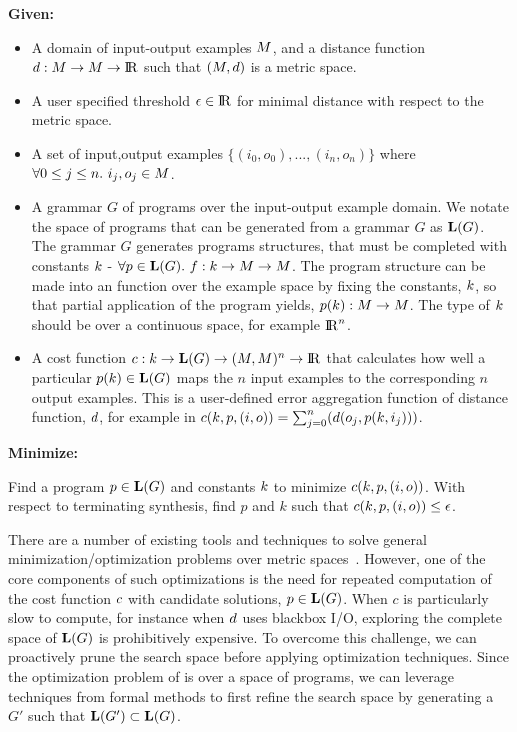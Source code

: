 \noindent\textbf{Given:}
\begin{itemize}[topsep=0pt]
  \item A domain of input-output examples $M$, and a distance function $d:M \to M \to {\rm I\!R}$ such that $(M,{d})$ is a metric space.
  \item A user specified threshold $\epsilon \in {\rm I\!R}$ for minimal distance with respect to the metric space.
  \item A set of input,output examples $\{(i_0,o_0),...,(i_n,o_n)\}$ where $\forall 0 \leq j \leq n.\ i_j,o_j \in M$.
  \item A grammar $G$ of programs over the input-output example domain. 
        We notate the space of programs that can be generated from a grammar $G$ as $\mathbf{L}(G)$.
        The grammar $G$ generates programs structures, that must be completed with constants ${k}$ - $\forall p \in \mathbf{L}(G).\ f: {k} \to M \to M$. 
        The program structure can be made into an function over the example space by fixing the constants, ${k}$, so that partial application of the program yields, $p({k}): M \to M$. 
        The type of ${k}$ should be over a continuous space, for example ${\rm I\!R}^n$. 
  \item A cost function ${c} : {k} \to \mathbf{L}(G) \to (M,M)^n \to {\rm I\!R}$ that calculates how well a particular $p({k}) \in \mathbf{L}(G)$ maps the $n$ input examples to the corresponding $n$ output examples. This is a user-defined error aggregation function of distance function, ${d}$, for example in ${c}({k},p,(i,o)) = \sum_{j=0}^{n} ({d}(o_j,p({k},i_j)))$.
\end{itemize}
\textbf{Minimize:}

Find a program $p \in \mathbf{L}(G)$ and constants ${k}$ to minimize ${c}({k},p,(i,o))$. 
With respect to terminating synthesis, find $p$ and $k$ such that ${c}({k},p,(i,o)) \leq \epsilon$.
\vspace{\baselineskip}

There are a number of existing tools and techniques to solve general minimization/optimization problems over metric spaces~\cite{optmizationTextbook}.
However, one of the core components of such optimizations is the need for repeated computation of the cost function ${c}$ with candidate solutions, $p \in \mathbf{L}(G)$.
When $c$ is particularly slow to compute, for instance when ${d}$ uses blackbox I/O, exploring the complete space of $\mathbf{L}(G)$ is prohibitively expensive.
To overcome this challenge, we can proactively prune the search space before applying optimization techniques.
Since the optimization problem of \approximatePBE is over a space of programs, we can leverage techniques from formal methods to first refine the search space by generating a $G'$ such that $\mathbf{L}(G') \subset \mathbf{L}(G)$.
